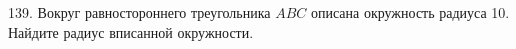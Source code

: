 139. Вокруг равностороннего треугольника $ABC$ описана окружность радиуса 10. Найдите радиус вписанной окружности.\\
